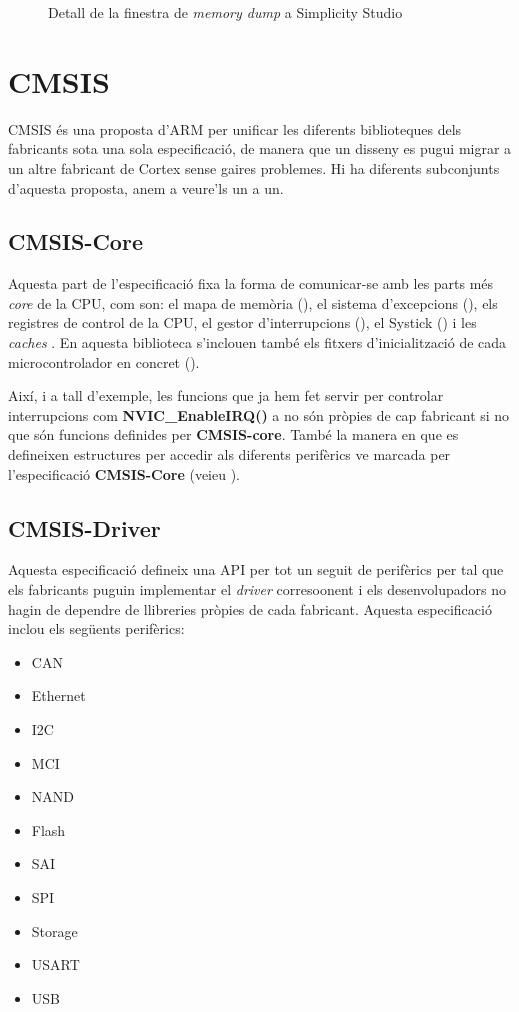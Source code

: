 \begin{figure}
 \centering
 \caption{Detall de la finestra de {\em memory dump} a Simplicity Studio}
 \label{fig:UnpackedMemoryStructure}
\end{figure}


\chapter{CMSIS}
\label{ch:CMSIS}
\gls{CMSIS} és una proposta d'ARM per unificar les diferents biblioteques dels fabricants sota una sola especificació, de manera que un disseny es pugui migrar a un altre fabricant de Cortex sense gaires problemes. Hi ha diferents subconjunts d'aquesta proposta, anem a veure'ls un a un.

\section{CMSIS-Core}
\label{sec:CMSIS-Core}
Aquesta part de l'especificació fixa la forma de comunicar-se amb les parts més {\em core} de la CPU, com son: el mapa de memòria (), el sistema d'excepcions (), els registres de control de la CPU, el gestor d'interrupcions (), el Systick () i les {\em caches} \cite{CMSIS-CORE}. En aquesta biblioteca s'inclouen també els fitxers d'inicialització de cada microcontrolador en concret ().

Així, i a tall d'exemple, les funcions que ja hem fet servir per controlar interrupcions com {\bf NVIC\_EnableIRQ()} a  no són pròpies de cap fabricant si no que són funcions definides per {\bf CMSIS-core}. També la manera en que es defineixen estructures per accedir als diferents perifèrics ve marcada per l'especificació {\bf CMSIS-Core} (veieu ).

\section{CMSIS-Driver}
Aquesta especificació defineix una \gls{API} per tot un seguit de perifèrics per tal que els fabricants puguin implementar el {\em driver} corresoonent i els desenvolupadors no hagin de dependre de llibreries pròpies de cada fabricant. Aquesta especificació inclou els següents perifèrics:
\begin{itemize}
 \item \gls{CAN}
 \item Ethernet
 \item I2C
 \item \gls{MCI}
 \item  NAND 
 \item Flash
 \item \gls{SAI}
 \item SPI
 \item Storage
 \item USART
 \item USB
\end{itemize}


